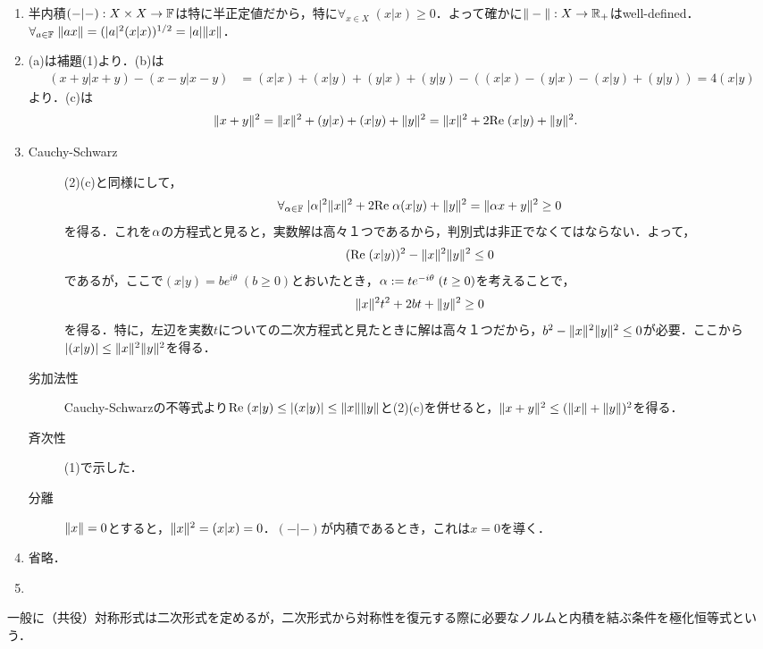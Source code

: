 \documentclass[uplatex,dvipdfmx]{jsreport}
\begin{document}
\begin{Proof}\mbox{}
    \begin{enumerate}
        \item 半内積$(-|-):X\times X\to\mathbb{F}$は特に半正定値だから，特に$\forall_{x\in X}\;(x|x)\ge 0$．よって確かに$\|-\|:X\to\mathbb{R}_+$はwell-defined．
        $\forall_{a\in\mathbb{F}}\;\|ax\|=(\lvert a\rvert^2(x|x))^{1/2}=\lvert a\rvert\|x\|$．
        \item (a)は補題(1)より．(b)は
        \begin{align*}
            (x+y|x+y)-(x-y|x-y)&=(x|x)+(x|y)+(y|x)+(y|y)-((x|x)-(y|x)-(x|y)+(y|y))=4(x|y)
        \end{align*}
        より．(c)は
        \begin{align*}
            \|x+y\|^2&=\|x\|^2+(y|x)+(x|y)+\|y\|^2=\|x\|^2+2\mathrm{Re}\;(x|y)+\|y\|^2.
        \end{align*}
        \item 
        \begin{description}
            \item[Cauchy-Schwarz] 
        (2)(c)と同様にして，
        \[\forall_{\alpha\in\mathbb{F}}\;\lvert\alpha\rvert^2\|x\|^2+2\mathrm{Re}\;\alpha(x|y)+\|y\|^2=\|\alpha x+y\|^2\ge 0\]
        を得る．これを$\alpha$の方程式と見ると，実数解は高々１つであるから，判別式は非正でなくてはならない．よって，
        \[(\mathrm{Re}\;(x|y))^2-\|x\|^2\|y\|^2\le 0\]
        であるが，ここで$(x|y)=be^{i\theta}\;(b\ge 0)$とおいたとき，$\alpha:=te^{-i\theta}\;(t\ge0)$を考えることで，
        \[\|x\|^2t^2+2bt+\|y\|^2\ge0\]
        を得る．特に，左辺を実数$t$についての二次方程式と見たときに解は高々１つだから，$b^2-\|x\|^2\|y\|^2\le 0$が必要．ここから$\lvert(x|y)\rvert\le\|x\|^2\|y\|^2$を得る．
            \item[劣加法性] Cauchy-Schwarzの不等式より$\mathrm{Re}\;(x|y)\le\lvert(x|y)\rvert\le\|x\|\|y\|$と(2)(c)を併せると，$\|x+y\|^2\le(\|x\|+\|y\|)^2$を得る．
            \item[斉次性] (1)で示した．
            \item[分離] $\|x\|=0$とすると，$\|x\|^2=(x|x)=0$．$(-|-)$が内積であるとき，これは$x=0$を導く．
        \end{description}
        \item 省略．
        \item 
    \end{enumerate}
\end{Proof}
\begin{remarks}
    一般に（共役）対称形式は二次形式を定めるが，二次形式から対称性を復元する際に必要なノルムと内積を結ぶ条件を極化恒等式という．
\end{remarks}
\end{document}
